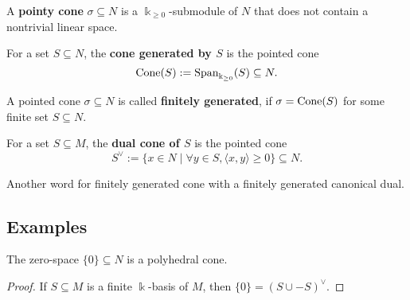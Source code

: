 \begin{definition}
  \label{pointy-cone}
  A {\bf pointy cone} \( \sigma \subseteq N \) is a \( \Bbbk_{\geq 0}
  \)-submodule of \( N \) that does not contain a nontrivial linear space.
\end{definition}

\begin{definition}
  \label{cone-span}
  \leanok
  For a set \( S \subseteq N \), the {\bf cone generated by \( S \)}
  is the pointed cone
  \[
      \operatorname{Cone}(S) := \operatorname{Span}_{\Bbbk_{\geq 0}}(S) \subseteq N.
  \]
\end{definition}

\begin{definition}
  \label{cone-finitely-generated}
  \leanok
  A pointed cone \( \sigma \subseteq N \) is called {\bf finitely
  generated}, if \( \sigma = \operatorname{Cone}(S) \) for some finite set \( S
  \subseteq N \).
\end{definition}

\begin{definition}
  \label{dual-cone}
  \leanok
  For a set \( S \subseteq M \), the {\bf dual cone of \( S \)} is
  the pointed cone
  \[
      S^\vee := \{x \in N \mid \forall y \in S, \langle x, y \rangle
      \geq 0 \} \subseteq N.
  \]
\end{definition}

\begin{definition}
  \label{polyhedral-cone}
  \leanok
  Another word for finitely generated cone with a finitely generated canonical dual.
\end{definition}

\subsection{Examples}

\begin{proposition}
  \label{bot-polyhedral}
  \leanok
  The zero-space \( \{0\} \subseteq N \) is a polyhedral cone.
\end{proposition}
\begin{proof}
  \uses{}
  \leanok
  If \( S \subseteq M \) is a finite \( \Bbbk \)-basis of \( M \),
  then \( \{0\} = (S \cup -S)^\vee \).
\end{proof}

